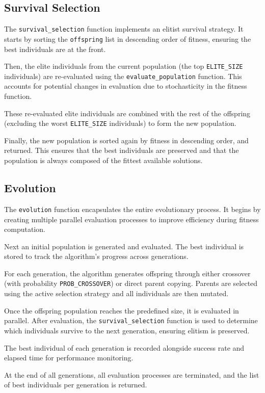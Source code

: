 \documentclass{article}
\begin{document}
\subsection{Survival Selection}
The \texttt{survival\_selection} function implements an elitist survival strategy. It starts by sorting the \texttt{offspring} list in descending order of fitness, ensuring the best individuals are at the front.

Then, the elite individuals from the current population (the top \texttt{ELITE\_SIZE} individuals) are re-evaluated using the \texttt{evaluate\_population} function. This accounts for potential changes in evaluation due to stochasticity in the fitness function.

These re-evaluated elite individuals are combined with the rest of the offspring (excluding the worst \texttt{ELITE\_SIZE} individuals) to form the new population.

Finally, the new population is sorted again by fitness in descending order, and returned. This ensures that the best individuals are preserved and that the population is always composed of the fittest available solutions.
\subsection{Evolution}
The \texttt{evolution} function encapsulates the entire evolutionary process. It begins by creating multiple parallel evaluation processes to improve efficiency during fitness computation.

Next an initial population is generated and evaluated. The best individual is stored to track the algorithm’s progress across generations.

For each generation, the algorithm generates offspring through either crossover (with probability \texttt{PROB\_CROSSOVER}) or direct parent copying. Parents are selected using the active selection strategy and all individuals are then mutated.

Once the offspring population reaches the predefined size, it is evaluated in parallel. After evaluation, the \texttt{survival\_selection} function is used to determine which individuals survive to the next generation, ensuring elitism is preserved.

The best individual of each generation is recorded alongside success rate and elapsed time for performance monitoring.

At the end of all generations, all evaluation processes are terminated, and the list of best individuals per generation is returned.
\end{document}
